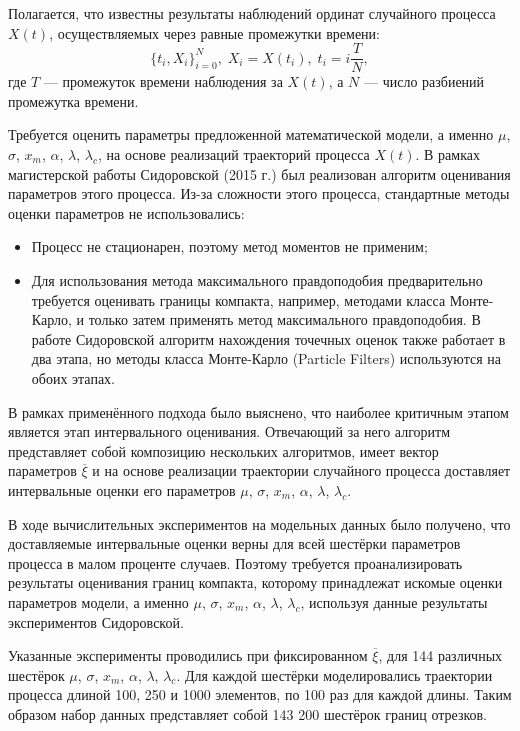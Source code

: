 Полагается, что известны результаты наблюдений ординат случайного процесса $X(t)$, осуществляемых через равные промежутки времени:
\begin{equation}
\{ t_i, X_i \}_{i=0}^N, \; X_i = X(t_i), \; t_i = i\frac{T}{N},
\end{equation}
где
$T$ --- промежуток времени наблюдения за $X(t)$, а $N$ --- число разбиений промежутка времени.

Требуется оценить параметры предложенной математической модели, а именно $\mu$, $\sigma$, $x_m$, $\alpha$, $\lambda$, $\lambda_c$, на основе реализаций траекторий процесса $X(t)$. В рамках магистерской работы Сидоровской (2015 г.) был реализован алгоритм оценивания параметров этого процесса. Из-за сложности этого процесса, стандартные методы оценки параметров не использовались:
\begin{itemize}
  \item Процесс не стационарен, поэтому метод моментов не применим;
  \item Для использования метода максимального правдоподобия предварительно требуется оценивать границы компакта, например, методами класса Монте-Карло, и только затем применять метод максимального правдоподобия. В работе Сидоровской алгоритм нахождения точечных оценок также работает в два этапа, но методы класса Монте-Карло (Particle Filters) используются на обоих этапах.
\end{itemize}

В рамках применённого подхода было выяснено, что наиболее критичным этапом является этап интервального оценивания. Отвечающий за него алгоритм представляет собой композицию нескольких алгоритмов, имеет вектор параметров $\overline{\xi}$ и на основе реализации траектории случайного процесса доставляет интервальные оценки его параметров $\mu$, $\sigma$, $x_m$, $\alpha$, $\lambda$, $\lambda_c$.

В ходе вычислительных экспериментов на модельных данных было получено, что доставляемые интервальные оценки верны для всей шестёрки параметров процесса в малом проценте случаев. Поэтому требуется проанализировать результаты оценивания границ компакта, которому принадлежат искомые оценки параметров модели, а именно $\mu$, $\sigma$, $x_m$, $\alpha$, $\lambda$, $\lambda_c$, используя данные результаты экспериментов Сидоровской.

Указанные эксперименты проводились при фиксированном $\overline{\xi}$, для 144 различных шестёрок $\mu$, $\sigma$, $x_m$, $\alpha$, $\lambda$, $\lambda_c$. Для каждой шестёрки моделировались траектории процесса длиной 100, 250 и 1000 элементов, по 100 раз для каждой длины. Таким образом набор данных представляет собой 143 200 шестёрок границ отрезков.

\clearpage